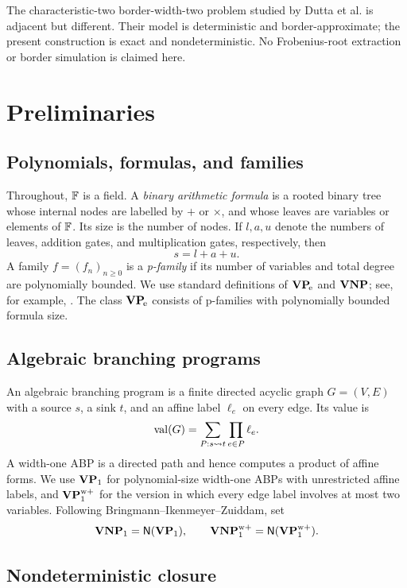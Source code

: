 The characteristic-two border-width-two problem studied by Dutta et al.
\cite{DuttaEtAl2024} is adjacent but different.  Their model is deterministic and
border-approximate; the present construction is exact and nondeterministic.  No
Frobenius-root extraction or border simulation is claimed here.

\section{Preliminaries}\label{sec:prelim}

\subsection{Polynomials, formulas, and families}

Throughout, \(\mathbb{F}\) is a field.  A \emph{binary arithmetic formula} is a rooted binary tree
whose internal nodes are labelled by \(+\) or \(\times\), and whose leaves are variables
or elements of \(\mathbb{F}\).  Its size is the number of nodes.  If \(l,a,u\) denote the numbers
of leaves, addition gates, and multiplication gates, respectively, then
\[
  s=l+a+u.
\]
A family \(f=(f_n)_{n\ge 0}\) is a \emph{p-family} if its number of variables and total
degree are polynomially bounded.  We use standard definitions of \(\mathbf{VP}_{\!\mathrm e}\) and \(\mathbf{VNP}\);
see, for example, \cite{Burgisser2000,MalodPortier2008}.  The class \(\mathbf{VP}_{\!\mathrm e}\) consists of
p-families with polynomially bounded formula size.

\subsection{Algebraic branching programs}

An algebraic branching program is a finite directed acyclic graph \(G=(V,E)\) with a
source \(s\), a sink \(t\), and an affine label \(\ell_e\) on every edge.  Its value is
\[
  \operatorname{val}(G)=\sum_{P:s\leadsto t}\prod_{e\in P}\ell_e.
\]
A width-one ABP is a directed path and hence computes a product of affine forms.  We use
\(\mathbf{VP}_{1}\) for polynomial-size width-one ABPs with unrestricted affine labels, and
\(\mathbf{VP}_{1}^{\mathrm{w}+}\) for the version in which every edge label involves at most two
variables.  Following Bringmann--Ikenmeyer--Zuiddam, set
\[
  \mathbf{VNP}_{1}=\mathsf{N}(\mathbf{VP}_{1}),
  \qquad
  \mathbf{VNP}_{1}^{\mathrm{w}+}=\mathsf{N}(\mathbf{VP}_{1}^{\mathrm{w}+}).
\]

\subsection{Nondeterministic closure}

